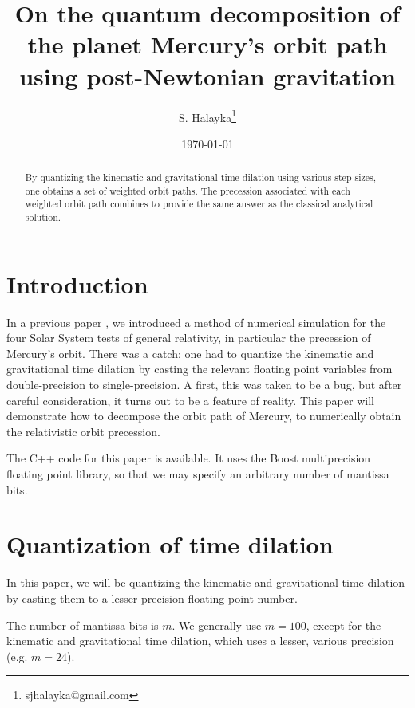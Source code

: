 \documentclass[12pt]{article}
\title{On the quantum decomposition of the planet Mercury's orbit path using post-Newtonian gravitation}
\author{S. Halayka\footnote{sjhalayka@gmail.com}}
\date{\today\;\currenttime}
\begin{document}
 
\maketitle

\begin{abstract}
By quantizing the kinematic and gravitational time dilation using various step sizes, one obtains a set of weighted orbit paths.
The precession associated with each weighted orbit path combines to provide the same answer as the classical analytical solution.
\end{abstract}





\section{Introduction}

In a previous paper \cite{halayka}, we introduced a method of numerical simulation for the four Solar System tests of general relativity, in particular the precession of Mercury's orbit.
There was a catch: one had to quantize the kinematic and gravitational time dilation by casting the relevant floating point variables from double-precision to single-precision.
A first, this was taken to be a bug, but after careful consideration, it turns out to be a feature of reality.
This paper will demonstrate how to decompose the orbit path of Mercury, to numerically obtain the relativistic orbit precession.

The C++ code for this paper is available.
It uses the Boost multiprecision floating point library, so that we may specify an arbitrary number of mantissa bits.


\section{Quantization of time dilation}

In this paper, we will be quantizing the kinematic and gravitational time dilation by casting them to a lesser-precision floating point number.

The number of mantissa bits is $m$.
We generally use $m = 100$, except for the kinematic and gravitational time dilation, which uses a lesser, various precision (e.g. $m = 24$).

\end{document}
